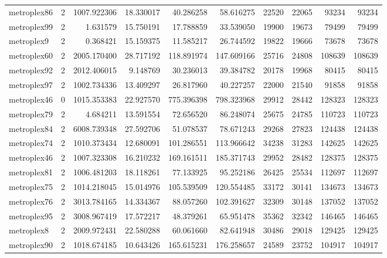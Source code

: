 \begin{longtable}{|l|r|r|r|r|r|r|r|r|r|}
metroplex86 & 2 & 1007.922306 & 18.330017 & 40.286258 & 58.616275 & 22520 & 22065 & 93234 & 93234 \\
metroplex99 & 2 & 1.631579 & 15.750191 & 17.788859 & 33.539050 & 19900 & 19673 & 79499 & 79499 \\
metroplex9 & 2 & 0.368421 & 15.159375 & 11.585217 & 26.744592 & 19822 & 19666 & 73678 & 73678 \\
metroplex60 & 2 & 2005.170400 & 28.717192 & 118.891974 & 147.609166 & 25716 & 24808 & 108639 & 108639 \\
metroplex92 & 2 & 2012.406015 & 9.148769 & 30.236013 & 39.384782 & 20178 & 19968 & 80415 & 80415 \\
metroplex97 & 2 & 1002.734336 & 13.409297 & 26.817960 & 40.227257 & 22000 & 21540 & 91858 & 91858 \\
metroplex46 & 0 & 1015.353383 & 22.927570 & 775.396398 & 798.323968 & 29912 & 28442 & 128323 & 128323 \\
metroplex79 & 2 & 4.684211 & 13.591554 & 72.656520 & 86.248074 & 25675 & 24785 & 110723 & 110723 \\
metroplex84 & 2 & 6008.739348 & 27.592706 & 51.078537 & 78.671243 & 29268 & 27823 & 124438 & 124438 \\
metroplex74 & 2 & 1010.373434 & 12.680091 & 101.286551 & 113.966642 & 34238 & 31283 & 142625 & 142625 \\
metroplex46 & 2 & 1007.323308 & 16.210232 & 169.161511 & 185.371743 & 29952 & 28482 & 128375 & 128375 \\
metroplex81 & 2 & 1006.481203 & 18.118261 & 77.133925 & 95.252186 & 26425 & 25534 & 112697 & 112697 \\
metroplex75 & 2 & 1014.218045 & 15.014976 & 105.539509 & 120.554485 & 33172 & 30141 & 134673 & 134673 \\
metroplex76 & 2 & 3013.784165 & 14.334367 & 88.057260 & 102.391627 & 32309 & 30148 & 137052 & 137052 \\
metroplex95 & 2 & 3008.967419 & 17.572217 & 48.379261 & 65.951478 & 35362 & 32342 & 146465 & 146465 \\
metroplex8 & 2 & 2009.972431 & 22.580288 & 60.061660 & 82.641948 & 30486 & 29018 & 129425 & 129425 \\
metroplex90 & 2 & 1018.674185 & 10.643426 & 165.615231 & 176.258657 & 24589 & 23752 & 104917 & 104917 \\
\end{longtable}
